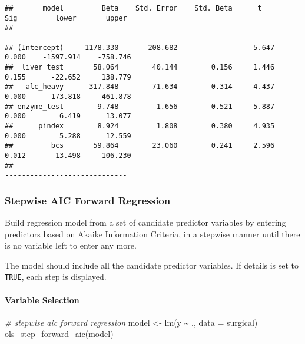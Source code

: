 \documentclass[
]{article}
\newenvironment{Shaded}{\begin{snugshade}}{\end{snugshade}}
\newcommand{\AttributeTok}[1]{\textcolor[rgb]{0.77,0.63,0.00}{#1}}
\newcommand{\CommentTok}[1]{\textcolor[rgb]{0.56,0.35,0.01}{\textit{#1}}}
\newcommand{\FunctionTok}[1]{\textcolor[rgb]{0.00,0.00,0.00}{#1}}
\newcommand{\NormalTok}[1]{#1}
\newcommand{\OtherTok}[1]{\textcolor[rgb]{0.56,0.35,0.01}{#1}}
\newcommand{\SpecialCharTok}[1]{\textcolor[rgb]{0.00,0.00,0.00}{#1}}
\begin{document}
\begin{verbatim}
##       model         Beta    Std. Error    Std. Beta      t        Sig         lower       upper 
## ------------------------------------------------------------------------------------------------
## (Intercept)    -1178.330       208.682                 -5.647    0.000    -1597.914    -758.746 
##  liver_test       58.064        40.144        0.156     1.446    0.155      -22.652     138.779 
##   alc_heavy      317.848        71.634        0.314     4.437    0.000      173.818     461.878 
## enzyme_test        9.748         1.656        0.521     5.887    0.000        6.419      13.077 
##      pindex        8.924         1.808        0.380     4.935    0.000        5.288      12.559 
##         bcs       59.864        23.060        0.241     2.596    0.012       13.498     106.230 
## ------------------------------------------------------------------------------------------------
\end{verbatim}

\hypertarget{stepwise-aic-forward-regression}{%
\subsubsection{Stepwise AIC Forward
Regression}\label{stepwise-aic-forward-regression}}

Build regression model from a set of candidate predictor variables by
entering predictors based on Akaike Information Criteria, in a stepwise
manner until there is no variable left to enter any more.

The model should include all the candidate predictor variables. If
details is set to \texttt{TRUE}, each step is displayed.

\hypertarget{variable-selection-4}{%
\paragraph{Variable Selection}\label{variable-selection-4}}

\begin{Shaded}
\begin{Highlighting}[]
\CommentTok{\# stepwise aic forward regression}
\NormalTok{model }\OtherTok{\textless{}{-}} \FunctionTok{lm}\NormalTok{(y }\SpecialCharTok{\textasciitilde{}}\NormalTok{ ., }\AttributeTok{data =}\NormalTok{ surgical)}
\FunctionTok{ols\_step\_forward\_aic}\NormalTok{(model)}
\end{Highlighting}
\end{Shaded}
\end{document}
